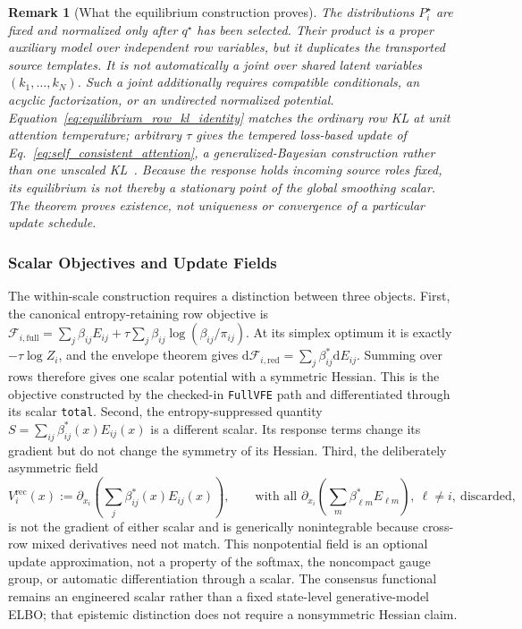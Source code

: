 \documentclass[11pt]{article}
\newtheorem{remark}{Remark}
\begin{document}
\begin{remark}[What the equilibrium construction proves]
\label{rem:equilibrium_model_scope}
The distributions $P_i^\star$ are fixed and normalized only after $q^\star$ has been selected. Their product is a proper auxiliary model over independent row variables, but it duplicates the transported source templates. It is not automatically a joint over shared latent variables $(k_1,\ldots,k_N)$. Such a joint additionally requires compatible conditionals, an acyclic factorization, or an undirected normalized potential. Equation~\eqref{eq:equilibrium_row_kl_identity} matches the ordinary row KL at unit attention temperature; arbitrary $\tau$ gives the tempered loss-based update of Eq.~\eqref{eq:self_consistent_attention}, a generalized-Bayesian construction rather than one unscaled KL~\cite{BissiriHolmesWalker2016}. Because the response holds incoming source roles fixed, its equilibrium is not thereby a stationary point of the global smoothing scalar. The theorem proves existence, not uniqueness or convergence of a particular update schedule.
\end{remark}

\subsubsection{Scalar Objectives and Update Fields}

The within-scale construction requires a distinction between three objects. First, the canonical entropy-retaining row objective is $\mathcal{F}_{i,\mathrm{full}}=\sum_j\beta_{ij}E_{ij}+\tau\sum_j\beta_{ij}\log(\beta_{ij}/\pi_{ij})$. At its simplex optimum it is exactly $-\tau\log Z_i$, and the envelope theorem gives $\mathrm{d}\mathcal{F}_{i,\mathrm{red}}=\sum_j\beta_{ij}^*\mathrm{d}E_{ij}$. Summing over rows therefore gives one scalar potential with a symmetric Hessian. This is the objective constructed by the checked-in \texttt{FullVFE} path and differentiated through its scalar \texttt{total}. Second, the entropy-suppressed quantity $S=\sum_{ij}\beta_{ij}^*(x)E_{ij}(x)$ is a different scalar. Its response terms change its gradient but do not change the symmetry of its Hessian. Third, the deliberately asymmetric field
\begin{equation}
V_i^{\mathrm{rec}}(x):=\partial_{x_i}\left(\sum_j\beta_{ij}^*(x)E_{ij}(x)\right),
\qquad
\text{with all }\partial_{x_i}\left(\sum_m\beta_{\ell m}^*E_{\ell m}\right),\ \ell\ne i,\ \text{discarded},
\label{eq:receiver_only_field}
\end{equation}
is not the gradient of either scalar and is generically nonintegrable because cross-row mixed derivatives need not match. This nonpotential field is an optional update approximation, not a property of the softmax, the noncompact gauge group, or automatic differentiation through a scalar. The consensus functional remains an engineered scalar rather than a fixed state-level generative-model ELBO; that epistemic distinction does not require a nonsymmetric Hessian claim.
\end{document}

